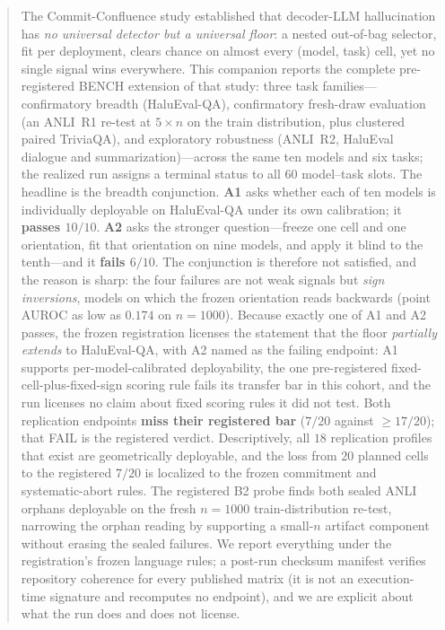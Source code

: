 \documentclass[11pt]{article}
\begin{document}
\begin{abstract}
\noindent
The Commit-Confluence study established that decoder-LLM hallucination has \emph{no universal
detector but a universal floor}: a nested out-of-bag selector, fit per deployment, clears chance
on almost every (model, task) cell, yet no single signal wins everywhere. This companion reports
the complete pre-registered BENCH extension of that study: three task families---confirmatory
breadth (HaluEval-QA), confirmatory fresh-draw evaluation (an ANLI~R1 re-test at $5\times n$ on
the train distribution, plus clustered paired TriviaQA), and exploratory robustness (ANLI~R2,
HaluEval dialogue and summarization)---across the same ten models and six tasks; the realized run
assigns a terminal status to all $60$ model--task slots. The headline is the breadth conjunction. \textbf{A1} asks
whether each of ten models is individually deployable on HaluEval-QA under its own calibration; it
\textbf{passes $10/10$}. \textbf{A2} asks the stronger question---freeze one cell and one
orientation, fit that orientation on nine models, and apply it blind to the tenth---and it
\textbf{fails $6/10$}. The conjunction is therefore not satisfied, and the reason is sharp: the
four failures are not weak signals but \emph{sign inversions}, models on which the frozen
orientation reads backwards (point AUROC as low as $0.174$ on $n{=}1000$). Because exactly one of
A1 and A2 passes, the frozen registration licenses the statement that the floor \emph{partially
extends} to HaluEval-QA, with A2 named as the failing endpoint: A1 supports per-model-calibrated
deployability, the one pre-registered fixed-cell-plus-fixed-sign scoring rule fails its transfer
bar in this cohort, and the run licenses no claim about fixed scoring rules it did not test. Both
replication endpoints \textbf{miss their registered bar} ($7/20$ against $\geq 17/20$); that FAIL
is the registered verdict. Descriptively, all $18$ replication profiles that exist are
geometrically deployable, and the loss from $20$ planned cells to the registered $7/20$ is
localized to the frozen commitment and systematic-abort rules. The registered B2 probe finds both
sealed ANLI orphans deployable on the fresh $n{=}1000$ train-distribution re-test, narrowing the
orphan reading by supporting a small-$n$ artifact component without erasing the sealed failures.
We report everything under the registration's frozen language rules; a post-run checksum manifest
verifies repository coherence for every published matrix (it is not an execution-time signature
and recomputes no endpoint), and we are explicit about what the run does and does not license.
\end{abstract}
\end{document}
